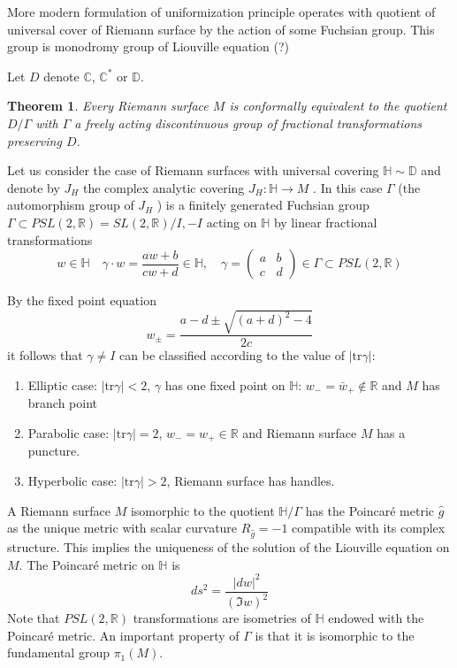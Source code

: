 \documentclass[12pt]{article}
\newtheorem{theorem}{Theorem}
\begin{document}
More modern formulation of uniformization principle operates with quotient of universal cover of
Riemann surface by the action of some Fuchsian group. This group is monodromy group of Liouville
equation (?)

Let $D$ denote $\mathbb{C}$, $\mathbb{C}^{*}$ or $\mathbb{D}$.
\begin{theorem}
Every Riemann surface $M$ is conformally equivalent to the quotient $D/\Gamma$ with $\Gamma$  a freely acting
discontinuous group of fractional transformations preserving $D$.
\end{theorem}

Let us consider the case of Riemann surfaces with universal covering $\mathbb{H}\sim \mathbb{D}$ and
denote by $J_{H}$ the complex analytic covering $J_{H} : \mathbb{H}\to M$ . In this case $\Gamma$
(the automorphism group of $J_{H}$ ) is a finitely generated Fuchsian 
group $\Gamma\subset PSL(2,
\mathbb{R}) = SL(2, \mathbb{R})/{I, -I}$ acting on $\mathbb{H}$ by linear fractional transformations
\begin{equation}
  \label{eq:106}
  w\in \mathbb{H}\quad \gamma\cdot w=\frac{aw+b}{cw+d}\in\mathbb{H},\quad
  \gamma=\begin{pmatrix} a & b\\ c & d\end{pmatrix} \in\Gamma\subset PSL(2,\mathbb{R})
\end{equation}

By the fixed point equation
\begin{equation}
  \label{eq:107}
  w_{\pm}=\frac{a-d\pm\sqrt{(a+d)^{2}-4}}{2c}
\end{equation}
it follows that $\gamma\neq I$ can be classified according to the value of $|\mathrm{tr} \gamma|$:
\begin{enumerate}
\item Elliptic case: $|\mathrm{tr} \gamma|<2$, $\gamma$ has one fixed point on $\mathbb{H}$:
  $w_{-}=\bar w_{+}\not\in\mathbb{R}$ and $M$ has branch point
\item Parabolic case: $|\mathrm{tr}\gamma|=2$, $w_{-}=w_{+}\in\mathbb{R}$ and Riemann surface $M$
  has a puncture.
\item Hyperbolic case: $|\mathrm{tr}\gamma|>2$, Riemann surface has handles. 
\end{enumerate}

   A Riemann surface $M$ isomorphic to the quotient $\mathbb{H}/\Gamma$ has the Poincar\'e metric $\hat g$ as the
unique metric with scalar curvature $R_{\hat g} = -1$ compatible with its complex structure. This
implies the uniqueness of the solution of the Liouville equation on $M$. The Poincar\'e metric
on $\mathbb{H}$ is
\begin{equation}
  \label{eq:108}
  ds^{2}=\frac{|dw|^{2}}{(\Im w)^{2}}
\end{equation}
Note that $P SL(2, \mathbb{R})$ transformations are isometries of $\mathbb{H}$ endowed with the Poincar\'e metric.
   An important property of $\Gamma$ is that it is isomorphic to the fundamental group $\pi_{1}(M)$.
\end{document}
